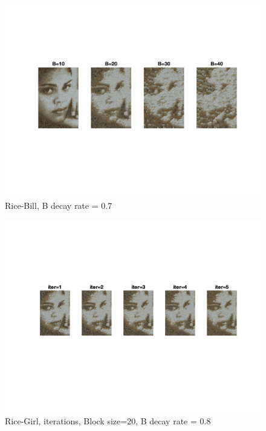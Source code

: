 \documentclass[10pt,twocolumn,letterpaper]{article}
\begin{document}
\begin{figure}[h]
    \begin{center}
    \includegraphics[trim={2cm 6cm 2cm 4cm}, clip, scale=0.9]{../results/bsize/res_rice_girl_bdr_0_700000_iter_5.png}
    \end{center}
    \vspace{-0.2em}
    \caption{Rice-Bill, B decay rate = 0.7}
    \label{fig:rice_girl_bs}
\end{figure}

\begin{figure}[h]
    \begin{center}
    \includegraphics[trim={2cm 6cm 2cm 4cm}, clip, scale=0.9]{../results/iters/res_rice_girl_b_20_bdr_0_800000.png}
    \end{center}
    \vspace{-0.2em}
    \caption{Rice-Girl, iterations, Block size=20, B decay rate = 0.8}
    \label{fig:rice_girl_iter}
\end{figure}
\end{document}
